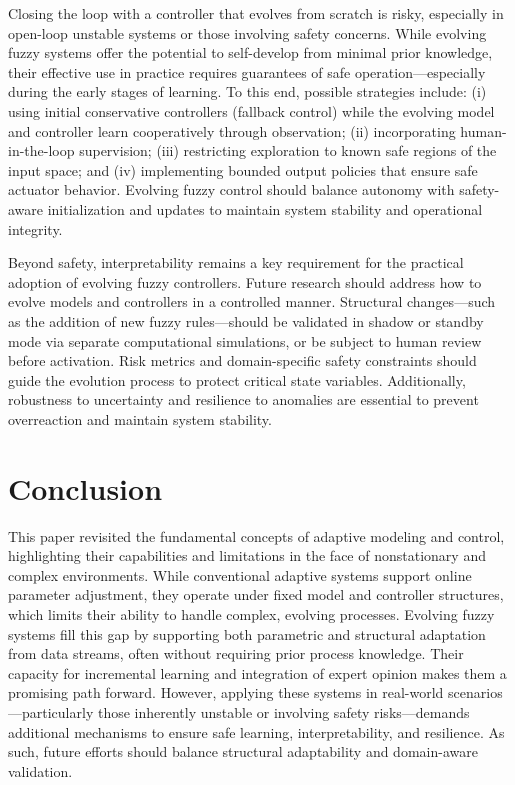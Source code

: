 \documentclass[conference]{IEEEtran}
\begin{document}
Closing the loop with a controller that evolves from scratch is risky, especially in open-loop unstable systems or those involving safety concerns. While evolving fuzzy systems offer the potential to self-develop from minimal prior knowledge, their effective use in practice requires guarantees of safe operation—especially during the early stages of learning. To this end, possible strategies include: (i) using initial conservative controllers (fallback control) while the evolving model and controller learn cooperatively through observation; (ii) incorporating human-in-the-loop supervision; (iii) restricting exploration to known safe regions of the input space; and (iv) implementing bounded output policies that ensure safe actuator behavior. Evolving fuzzy control should balance autonomy with safety-aware initialization and updates to maintain system stability and operational integrity.

Beyond safety, interpretability remains a key requirement for the practical adoption of evolving fuzzy controllers. Future research should address how to evolve models and controllers in a controlled manner. Structural changes—such as the addition of new fuzzy rules—should be validated in shadow or standby mode via separate computational simulations, or be subject to human review before activation. Risk metrics and domain-specific safety constraints should guide the evolution process to protect critical state variables. Additionally, robustness to uncertainty and resilience to anomalies are essential to prevent overreaction and maintain system stability.


\section{Conclusion}

This paper revisited the fundamental concepts of adaptive modeling and control, highlighting their capabilities and limitations in the face of nonstationary and complex environments. While conventional adaptive systems support online parameter adjustment, they operate under fixed model and controller structures, which limits their ability to handle complex, evolving processes. Evolving fuzzy systems fill this gap by supporting both parametric and structural adaptation from data streams, often without requiring prior process knowledge. Their capacity for incremental learning and integration of expert opinion makes them a promising path forward. However, applying these systems in real-world scenarios—particularly those inherently unstable or involving safety risks—demands additional mechanisms to ensure safe learning, interpretability, and resilience. As such, future efforts should balance structural adaptability and domain-aware validation.
\end{document}
